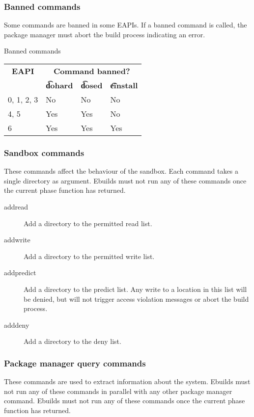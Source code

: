 \subsubsection{Banned commands}
\label{sec:banned-commands}

 Some commands are banned in some EAPIs. If a banned command is
called, the package manager must abort the build process indicating an error.

\begin{centertable}{Banned commands}
    \label{tab:banned-commands-table}
    \begin{tabular}{llll}
      \toprule
      \multicolumn{1}{c}{\textbf{EAPI}} &
      \multicolumn{3}{c}{\textbf{Command banned?}} \\
      \multicolumn{1}{c}{} &
      \multicolumn{1}{c}{\textbf{\t{dohard}}} &
      \multicolumn{1}{c}{\textbf{\t{dosed}}} &
      \multicolumn{1}{c}{\textbf{\t{einstall}}} \\
      \midrule
      0, 1, 2, 3        & No  & No  & No  \\
      4, 5              & Yes & Yes & No  \\
      6                 & Yes & Yes & Yes \\
      \bottomrule
    \end{tabular}
\end{centertable}

\subsubsection{Sandbox commands}
These commands affect the behaviour of the sandbox. Each command takes a single directory as
argument. Ebuilds must not run any of these commands once the current phase function has returned.
\begin{description}
\item[addread] Add a directory to the permitted read list.
\item[addwrite] Add a directory to the permitted write list.
\item[addpredict] Add a directory to the predict list. Any write to a location in this list will be
    denied, but will not trigger access violation messages or abort the build process.
\item[adddeny] Add a directory to the deny list.
\end{description}

\subsubsection{Package manager query commands}
These commands are used to extract information about the system. Ebuilds must not run any of
these commands in parallel with any other package manager command. Ebuilds must not run any of
these commands once the current phase function has returned.

